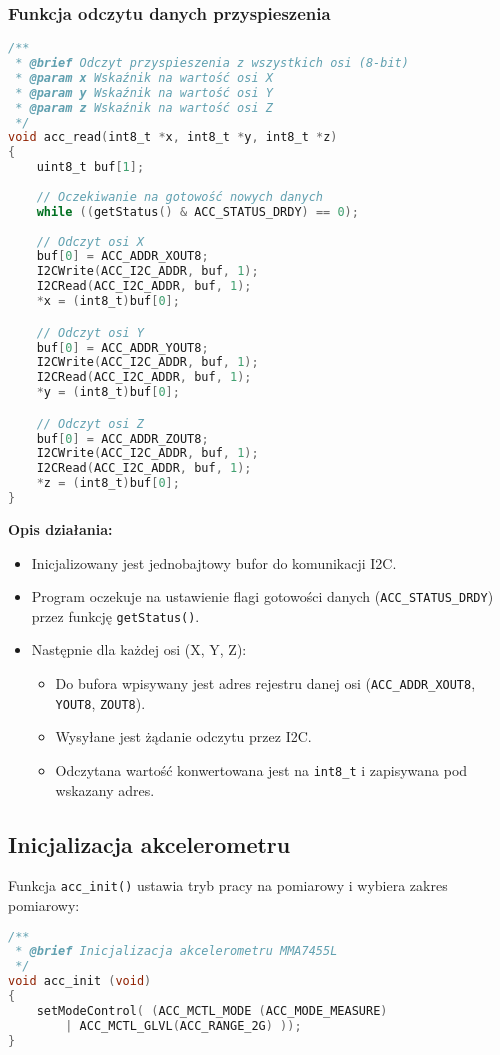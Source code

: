 \documentclass[a4paper,12pt]{report}
\begin{document}
\subsubsection{Funkcja odczytu danych przyspieszenia}

\begin{lstlisting}[language=C]
/**
 * @brief Odczyt przyspieszenia z wszystkich osi (8-bit)
 * @param x Wskaźnik na wartość osi X
 * @param y Wskaźnik na wartość osi Y  
 * @param z Wskaźnik na wartość osi Z
 */
void acc_read(int8_t *x, int8_t *y, int8_t *z)
{
    uint8_t buf[1];
    
    // Oczekiwanie na gotowość nowych danych
    while ((getStatus() & ACC_STATUS_DRDY) == 0);
    
    // Odczyt osi X
    buf[0] = ACC_ADDR_XOUT8;
    I2CWrite(ACC_I2C_ADDR, buf, 1);
    I2CRead(ACC_I2C_ADDR, buf, 1);
    *x = (int8_t)buf[0];

    // Odczyt osi Y
    buf[0] = ACC_ADDR_YOUT8;
    I2CWrite(ACC_I2C_ADDR, buf, 1);
    I2CRead(ACC_I2C_ADDR, buf, 1);
    *y = (int8_t)buf[0];

    // Odczyt osi Z
    buf[0] = ACC_ADDR_ZOUT8;
    I2CWrite(ACC_I2C_ADDR, buf, 1);
    I2CRead(ACC_I2C_ADDR, buf, 1);
    *z = (int8_t)buf[0];
}
\end{lstlisting}


\textbf{Opis działania:}
\begin{itemize}
    \item Inicjalizowany jest jednobajtowy bufor do komunikacji I2C.
    \item Program oczekuje na ustawienie flagi gotowości danych (\texttt{ACC\_STATUS\_DRDY}) przez funkcję \texttt{getStatus()}.
    \item Następnie dla każdej osi (X, Y, Z):
    \begin{itemize}
        \item Do bufora wpisywany jest adres rejestru danej osi (\texttt{ACC\_ADDR\_XOUT8}, \texttt{YOUT8}, \texttt{ZOUT8}).
        \item Wysyłane jest żądanie odczytu przez I2C.
        \item Odczytana wartość konwertowana jest na \texttt{int8\_t} i zapisywana pod wskazany adres.
    \end{itemize}
\end{itemize}

\noindent\begin{minipage}{\linewidth}
\subsection*{Inicjalizacja akcelerometru}

Funkcja \texttt{acc\_init()} ustawia tryb pracy na pomiarowy i wybiera zakres pomiarowy:
\begin{lstlisting}[language=C]
/**
 * @brief Inicjalizacja akcelerometru MMA7455L
 */
void acc_init (void)
{
    setModeControl( (ACC_MCTL_MODE (ACC_MODE_MEASURE)
        | ACC_MCTL_GLVL(ACC_RANGE_2G) ));
}
\end{lstlisting}
\end{minipage}
\end{document}
